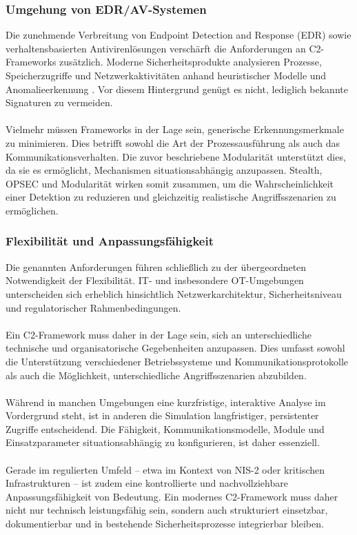 \subsubsection{Umgehung von EDR/AV-Systemen}
Die zunehmende Verbreitung von Endpoint Detection and Response (EDR) sowie verhaltensbasierten Antivirenlösungen verschärft die Anforderungen an C2-Frameworks zusätzlich. 
Moderne Sicherheitsprodukte analysieren Prozesse, Speicherzugriffe und Netzwerkaktivitäten anhand heuristischer Modelle und Anomalieerkennung \cite{heuristic}. 
Vor diesem Hintergrund genügt es nicht, lediglich bekannte Signaturen zu vermeiden.
\\\\
Vielmehr müssen Frameworks in der Lage sein, generische Erkennungsmerkmale zu minimieren. 
Dies betrifft sowohl die Art der Prozessausführung als auch das Kommunikationsverhalten. 
Die zuvor beschriebene Modularität unterstützt dies, da sie es ermöglicht, Mechanismen situationsabhängig anzupassen. 
Stealth, OPSEC und Modularität wirken somit zusammen, um die Wahrscheinlichkeit einer Detektion zu reduzieren und gleichzeitig realistische Angriffsszenarien zu ermöglichen.
\subsubsection{Flexibilität und Anpassungsfähigkeit}
Die genannten Anforderungen führen schließlich zu der übergeordneten Notwendigkeit der Flexibilität. 
IT- und insbesondere OT-Umgebungen unterscheiden sich erheblich hinsichtlich Netzwerkarchitektur, Sicherheitsniveau und regulatorischer Rahmenbedingungen.
\\\\
Ein C2-Framework muss daher in der Lage sein, sich an unterschiedliche technische und organisatorische Gegebenheiten anzupassen. 
Dies umfasst sowohl die Unterstützung verschiedener Betriebssysteme und Kommunikationsprotokolle als auch die Möglichkeit, unterschiedliche Angriffsszenarien abzubilden.
\\\\
Während in manchen Umgebungen eine kurzfristige, interaktive Analyse im Vordergrund steht, ist in anderen die Simulation langfristiger, persistenter Zugriffe entscheidend. 
Die Fähigkeit, Kommunikationsmodelle, Module und Einsatzparameter situationsabhängig zu konfigurieren, ist daher essenziell.
\\\\
Gerade im regulierten Umfeld – etwa im Kontext von NIS-2 oder kritischen Infrastrukturen – ist zudem eine kontrollierte und nachvollziehbare Anpassungsfähigkeit von Bedeutung. 
Ein modernes C2-Framework muss daher nicht nur technisch leistungsfähig sein, sondern auch strukturiert einsetzbar, dokumentierbar und in bestehende Sicherheitsprozesse integrierbar bleiben.
